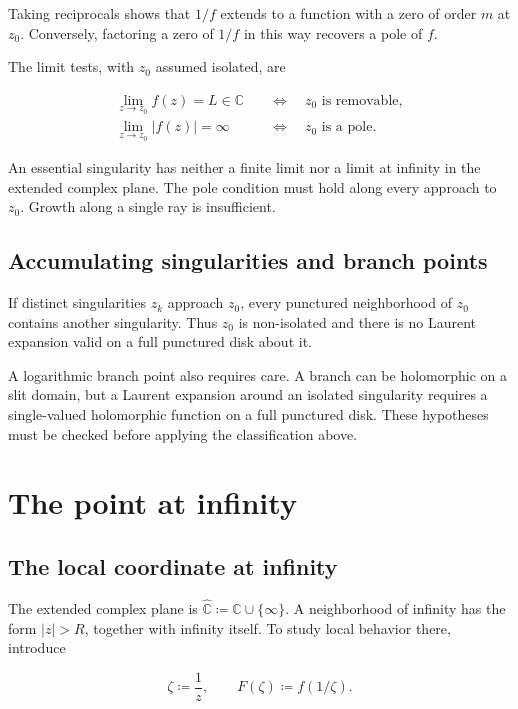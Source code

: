 \documentclass[11pt,a4paper]{article}
\theoremstyle{definition}
\theoremstyle{plain}
\begin{document}
Taking reciprocals shows that $1/f$ extends to a function with a zero of order $m$ at $z_0$. Conversely, factoring a zero of $1/f$ in this way recovers a pole of $f$.

The limit tests, with $z_0$ assumed isolated, are

\[
\begin{aligned}
\lim_{z\to z_0}f(z)=L\in\mathbb C
&\quad\Longleftrightarrow\quad z_0\text{ is removable},\\
\lim_{z\to z_0}|f(z)|=\infty
&\quad\Longleftrightarrow\quad z_0\text{ is a pole}.
\end{aligned}
\]

An essential singularity has neither a finite limit nor a limit at infinity in the extended complex plane. The pole condition must hold along every approach to $z_0$. Growth along a single ray is insufficient.

\subsection{Accumulating singularities and branch points}

If distinct singularities $z_k$ approach $z_0$, every punctured neighborhood of $z_0$ contains another singularity. Thus $z_0$ is non-isolated and there is no Laurent expansion valid on a full punctured disk about it.

A logarithmic branch point also requires care. A branch can be holomorphic on a slit domain, but a Laurent expansion around an isolated singularity requires a single-valued holomorphic function on a full punctured disk. These hypotheses must be checked before applying the classification above.

\section{The point at infinity}

\subsection{The local coordinate at infinity}

The extended complex plane is $\widehat{\mathbb C}\coloneqq\mathbb C\cup\{\infty\}$. A neighborhood of infinity has the form $|z|>R$, together with infinity itself. To study local behavior there, introduce

\[
\zeta\coloneqq\frac1z,\qquad F(\zeta)\coloneqq f(1/\zeta).
\]
\end{document}
